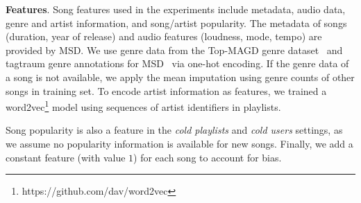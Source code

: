 {\bf Features}.
Song features used in the experiments include metadata, audio data, genre and artist information, and song/artist popularity.
%
The metadata of songs (\eg duration, year of release) and audio features (\eg loudness, mode, tempo) are provided by MSD.
We use genre data from the Top-MAGD genre dataset~\cite{schindler2012facilitating}
and tagtraum genre annotations for MSD~\cite{schreiber2015improving} via one-hot encoding.
If the genre data of a song is not available, we apply the mean imputation using genre counts of other songs in training set.
To encode artist information as features,
we trained a word2vec\footnote{https://github.com/dav/word2vec} model using sequences of artist identifiers in playlists.

Song popularity is also a feature in the \emph{cold playlists} and \emph{cold users} settings, as we assume no popularity information 
is available for new songs.
Finally, we add a constant feature (with value $1$) for each song to account for bias.





